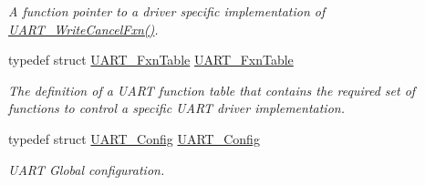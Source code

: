\begin{DoxyCompactItemize}
\begin{DoxyCompactList}\small\item\em A function pointer to a driver specific implementation of \hyperlink{_u_a_r_t_8h_ac5a3d974279a2d161746dfbc8ca91774}{U\+A\+R\+T\+\_\+\+Write\+Cancel\+Fxn()}. \end{DoxyCompactList}\item 
typedef struct \hyperlink{struct_u_a_r_t___fxn_table}{U\+A\+R\+T\+\_\+\+Fxn\+Table} \hyperlink{_u_a_r_t_8h_a24d497f125179ba5e5b16ad9a0aa249d}{U\+A\+R\+T\+\_\+\+Fxn\+Table}
\begin{DoxyCompactList}\small\item\em The definition of a U\+A\+R\+T function table that contains the required set of functions to control a specific U\+A\+R\+T driver implementation. \end{DoxyCompactList}\item 
typedef struct \hyperlink{struct_u_a_r_t___config}{U\+A\+R\+T\+\_\+\+Config} \hyperlink{_u_a_r_t_8h_ae513322c7d3184d66173cba9349989a4}{U\+A\+R\+T\+\_\+\+Config}
\begin{DoxyCompactList}\small\item\em U\+A\+R\+T Global configuration. \end{DoxyCompactList}\end{DoxyCompactItemize}
